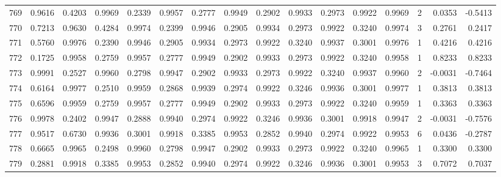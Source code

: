 \begin{tabular}{lrrrrrrrrrrrrrrr}
769 &      0.9616 &  0.4203 &  0.9969 &  0.2339 &  0.9957 &  0.2777 &  0.9949 &  0.2902 &  0.9933 &  0.2973 &   0.9922 &     0.9969 &      2 &                    0.0353 &                    -0.5413 \\
770 &      0.7213 &  0.9630 &  0.4284 &  0.9974 &  0.2399 &  0.9946 &  0.2905 &  0.9934 &  0.2973 &  0.9922 &   0.3240 &     0.9974 &      3 &                    0.2761 &                     0.2417 \\
771 &      0.5760 &  0.9976 &  0.2390 &  0.9946 &  0.2905 &  0.9934 &  0.2973 &  0.9922 &  0.3240 &  0.9937 &   0.3001 &     0.9976 &      1 &                    0.4216 &                     0.4216 \\
772 &      0.1725 &  0.9958 &  0.2759 &  0.9957 &  0.2777 &  0.9949 &  0.2902 &  0.9933 &  0.2973 &  0.9922 &   0.3240 &     0.9958 &      1 &                    0.8233 &                     0.8233 \\
773 &      0.9991 &  0.2527 &  0.9960 &  0.2798 &  0.9947 &  0.2902 &  0.9933 &  0.2973 &  0.9922 &  0.3240 &   0.9937 &     0.9960 &      2 &                   -0.0031 &                    -0.7464 \\
774 &      0.6164 &  0.9977 &  0.2510 &  0.9959 &  0.2868 &  0.9939 &  0.2974 &  0.9922 &  0.3246 &  0.9936 &   0.3001 &     0.9977 &      1 &                    0.3813 &                     0.3813 \\
775 &      0.6596 &  0.9959 &  0.2759 &  0.9957 &  0.2777 &  0.9949 &  0.2902 &  0.9933 &  0.2973 &  0.9922 &   0.3240 &     0.9959 &      1 &                    0.3363 &                     0.3363 \\
776 &      0.9978 &  0.2402 &  0.9947 &  0.2888 &  0.9940 &  0.2974 &  0.9922 &  0.3246 &  0.9936 &  0.3001 &   0.9918 &     0.9947 &      2 &                   -0.0031 &                    -0.7576 \\
777 &      0.9517 &  0.6730 &  0.9936 &  0.3001 &  0.9918 &  0.3385 &  0.9953 &  0.2852 &  0.9940 &  0.2974 &   0.9922 &     0.9953 &      6 &                    0.0436 &                    -0.2787 \\
778 &      0.6665 &  0.9965 &  0.2498 &  0.9960 &  0.2798 &  0.9947 &  0.2902 &  0.9933 &  0.2973 &  0.9922 &   0.3240 &     0.9965 &      1 &                    0.3300 &                     0.3300 \\
779 &      0.2881 &  0.9918 &  0.3385 &  0.9953 &  0.2852 &  0.9940 &  0.2974 &  0.9922 &  0.3246 &  0.9936 &   0.3001 &     0.9953 &      3 &                    0.7072 &                     0.7037 \\

\end{tabular}
